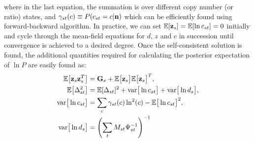 \documentclass[nofootinbib,amssymb,amsmath]{revtex4}
\newcommand{\vz}{{\bf z}}
\newcommand{\vn}{{\bf n}}
\newcommand{\vG}{{\bf G}}
\newcommand{\EE}{\mathbb{E}}
\begin{document}
where in the last equation, the summation is over different copy number (or ratio) states, and $\gamma_{st}(c) \equiv P(c_{st} = c | \vn)$ which can be efficiently found using forward-backward algorithm. In practice, we can set $\EE[\vz_s] = \EE[\ln c_{st}] = 0$ initially and cycle through the mean-field equations for $d$, $z$ and $c$ in succession until convergence is achieved to a desired degree. Once the self-consistent solution is found, the additional quantities required for calculating the posterior expectation of $\ln P$ are easily found as:
\begin{align}
\EE\big[\vz_s \vz_s^T \big] &= \vG_s + \EE\big[\vz_s\big] \EE\big[\vz_s\big]^T,\nonumber\\
\EE\big[\Delta_{st}^2\big] &= \EE[\Delta_{st}]^2 + \mathrm{var}\big[\ln c_{st}\big] + \mathrm{var}\big[\ln d_{s}\big],\nonumber\\
\mathrm{var}\big[\ln c_{st}\big] &= \sum_{c} \gamma_{st}(c) \ln^2(c) - \EE\big[\ln c_{st}\big]^2,\nonumber\\
\mathrm{var}\big[\ln d_s\big] &= \left(\sum_t M_{st} \Psi_{st}^{-1}\right)^{-1}
\end{align}
\end{document}
